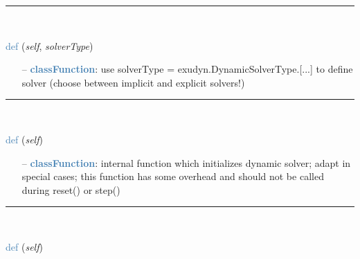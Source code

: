 \begin{itemize}[leftmargin=1.4cm]
\begin{itemize}[leftmargin=1.4cm]
\begin{itemize}[leftmargin=0.7cm]
\begin{itemize}[leftmargin=1.2cm]
\end{itemize}
\vspace{12pt}\end{itemize}
%
\noindent\rule{8cm}{0.75pt}\vspace{1pt} \\ 
\begin{flushleft}
\noindent \textcolor{steelblue}{def {\bf {}}}\label{sec:artificialIntelligence:OpenAIGymInterfaceEnv(Env):SetSolver}
({\it self}, {\it solverType})
\end{flushleft}
\setlength{\itemindent}{0.7cm}
\begin{itemize}[leftmargin=0.7cm]
\item[--]\textcolor{steelblue}{\bf classFunction}: use solverType = exudyn.DynamicSolverType.[...] to define solver (choose between implicit and explicit solvers!)
\vspace{12pt}\end{itemize}
%
\noindent\rule{8cm}{0.75pt}\vspace{1pt} \\ 
\begin{flushleft}
\noindent \textcolor{steelblue}{def {\bf {}}}\label{sec:artificialIntelligence:OpenAIGymInterfaceEnv(Env):PreInitializeSolver}
({\it self})
\end{flushleft}
\setlength{\itemindent}{0.7cm}
\begin{itemize}[leftmargin=0.7cm]
\item[--]\textcolor{steelblue}{\bf classFunction}: internal function which initializes dynamic solver; adapt in special cases; this function has some overhead and should not be called during reset() or step()
\vspace{12pt}\end{itemize}
%
\noindent\rule{8cm}{0.75pt}\vspace{1pt} \\ 
\begin{flushleft}
\noindent \textcolor{steelblue}{def {\bf {}}}\label{sec:artificialIntelligence:OpenAIGymInterfaceEnv(Env):IntegrateStep}
({\it self})
\end{flushleft}
\setlength{\itemindent}{0.7cm}
\begin{itemize}[leftmargin=0.7cm]

\end{itemize}
\end{itemize}
\end{itemize}
